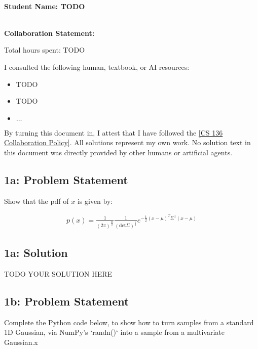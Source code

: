 \documentclass[10pt]{article}
\newcommand{\officialdirections}[1]{{\color{purple} #1}}
\begin{document}
~\\ %
{\Large{\bf Student Name: TODO}}

~\\ %
{\bf Collaboration Statement:}

Total hours spent: TODO

I consulted the following human, textbook, or AI resources:
\begin{itemize}
\item TODO
\item TODO
\item $\ldots$	
\end{itemize}

By turning this document in, I attest that I have followed the 
\href{https://www.cs.tufts.edu/cs/136/2025f/index.html#collaboration}{[CS 136 Collaboration Policy]}. All solutions represent my own work. No solution text in this document was directly provided by other humans or artificial agents. 

\tableofcontents

\newpage

\officialdirections{
\subsection*{1a: Problem Statement}
Show that the pdf of $x$ is given by:

\begin{align}
p(x) = \frac{1}{(2\pi)^{\frac{D}{2}}}
\frac{1}{(\text{det} \Sigma)^{\frac{1}{2}}}
e^{-\frac{1}{2} (x-\mu)^T \Sigma^{1} (x-\mu)}
\end{align}
}

\subsection{1a: Solution}
TODO YOUR SOLUTION HERE

\newpage 
\officialdirections{
\subsection*{1b: Problem Statement}
Complete the Python code below, to show how to turn samples from a standard 1D Gaussian, via NumPy's `randn()` into a sample from a multivariate Gaussian.x}
\end{document}
